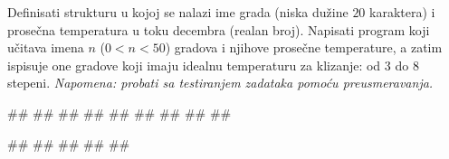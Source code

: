 \begin{Exercise}[label=struc.3] 
Definisati strukturu  u kojoj se nalazi ime grada (niska
dužine $20$ karaktera) i prosečna temperatura u toku decembra (realan
broj). Napisati program koji učitava imena $n$ ($0<n<50$) gradova i
njihove prosečne temperature, a zatim ispisuje one gradove koji imaju
idealnu temperaturu za klizanje: od $3$ do $8$
stepeni. \textit{Napomena: probati sa testiranjem zadataka pomoću
  preusmeravanja.}

\begin{maxitest}
\begin{upotreba}{1}
#\naslovInt#
##
##
##
##
##
##
##
##
\end{upotreba}
\end{maxitest}

\begin{maxitest}
\begin{upotreba}{2}
#\naslovInt#
##
##
##
##
\end{upotreba}
\end{maxitest}
 
\end{Exercise}
\begin{Answer}[ref=struc.3]
\end{Answer}


